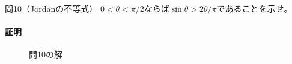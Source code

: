 \begin{mysimplebox}{問10（Jordanの不等式）}
    $0<\theta<\pi/2$ならば$\sin\theta>2\theta/\pi$であることを示せ。
\end{mysimplebox}
\paragraph{証明}

\begin{figure}
    \centering
\scalebox{0.6}{}
\caption{問10の解}
\end{figure}